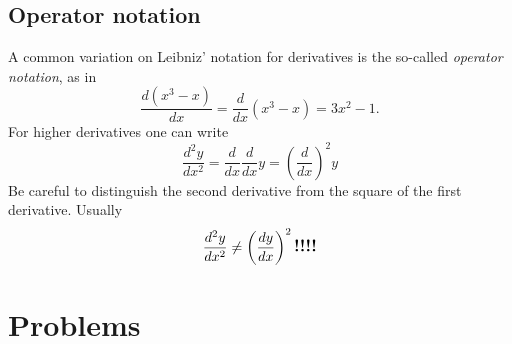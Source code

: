 \subsection{Operator notation}
\label{sec:04operator-notation}
A common variation on Leibniz' notation for derivatives is the so-called
\emph{operator notation}, as in
\[
\frac{d(x^3-x)}{dx} = \frac{d}{dx} (x^3-x)= 3x^2-1.
\]
For higher derivatives one can write
\[
\frac{d^2y}{dx^2}
= \frac{d} {dx} \frac{d} {dx}y
= \left(\frac{d}{dx}\right)^2 y
\]
Be careful to distinguish the second derivative from the square of the first
derivative. Usually
\[
\frac{d^2y}{dx^2}\ne\left(\frac{dy}{dx}\right)^2\text{\large\bfseries!!!!}
\]

\section{Problems}
\problemfont

